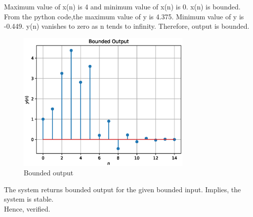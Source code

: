 \documentclass[journal,12pt,twocolumn]{IEEEtran}
\begin{document}
Maximum value of x(n) is 4 and minimum value of x(n) is
0. x(n) is bounded.\\
From the python code,the maximum value of y is 4.375. Minimum value of y is -0.449. y(n) vanishes to zero as n tends to infinity. Therefore, output is bounded.\\
\begin{figure}[h!]
    \centering
    \includegraphics[width=8.5cm]{./figs/y_n.eps}
    \caption{Bounded output}
    \label{yn}
\end{figure}
The system returns bounded output for the given bounded input. Implies, the system is stable.\\ Hence, verified.
\end{document}
